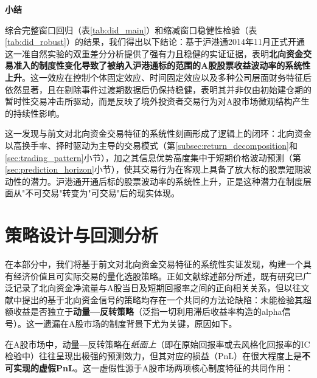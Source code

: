 \documentclass{article}
\begin{document}
\vspace{0.5em}
\noindent\textbf{小结}

综合完整窗口回归（表\ref{tab:did_main}）和缩减窗口稳健性检验（表\ref{tab:did_robust}）的结果，我们得出以下结论：基于沪港通2014年11月正式开通这一准自然实验的双重差分分析提供了强有力且稳健的实证证据，表明\textbf{北向资金交易准入的制度性变化导致了被纳入沪港通标的范围的A股股票收益波动率的系统性上升}。这一效应在控制个体固定效应、时间固定效应以及多种公司层面财务特征后依然显著，且在剔除事件过渡期数据后仍保持稳健，表明其并非仅由初始建仓期的暂时性交易冲击所驱动，而是反映了境外投资者交易行为对A股市场微观结构产生的持续性影响。

这一发现与前文对北向资金交易特征的系统性刻画形成了逻辑上的闭环：北向资金以高换手率、择时驱动为主导的交易模式（第\ref{subsec:return_decomposition}和\ref{sec:trading_pattern}小节），加之其信息优势高度集中于短期价格波动预测（第\ref{sec:prediction_horizon}小节），使其交易行为在客观上具备了放大标的股票短期波动性的潜力。沪港通开通后标的股票波动率的系统性上升，正是这种潜力在制度层面从"不可交易"转变为"可交易"后的现实体现。

\newpage
\section{策略设计与回测分析}
\label{sec:strategy}

在本部分中，我们将基于前文对北向资金交易特征的系统性实证发现，构建一个具有经济价值且可实际交易的量化选股策略。正如文献综述部分所述，既有研究已广泛记录了北向资金净流量与A股当日及短期回报率之间的正向相关关系，但以往文献中提出的基于北向资金信号的策略均存在一个共同的方法论缺陷：未能检验其超额收益是否独立于\textbf{动量—反转策略}（泛指一切利用滞后收益率构造的alpha信号）。这一遗漏在A股市场的制度背景下尤为关键，原因如下。

在A股市场中，动量—反转策略在\textit{纸面上}（即在原始回报率或去风格化回报率的IC检验中）往往呈现出极强的预测效力，但其对应的损益（PnL）在很大程度上是\textbf{不可实现的虚假PnL}。这一虚假性源于A股市场两项核心制度特征的共同作用：
\end{document}
